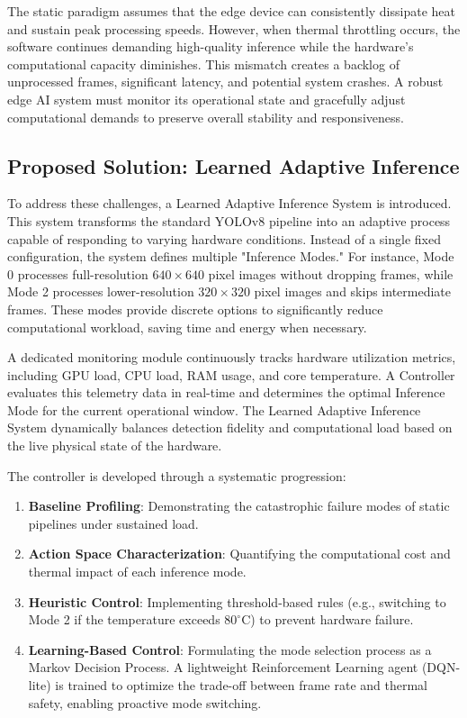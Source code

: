 \documentclass{ieeeaccess}
\begin{document}
The static paradigm assumes that the edge device can consistently dissipate heat and sustain peak processing speeds. However, when thermal throttling occurs, the software continues demanding high-quality inference while the hardware's computational capacity diminishes. This mismatch creates a backlog of unprocessed frames, significant latency, and potential system crashes. A robust edge AI system must monitor its operational state and gracefully adjust computational demands to preserve overall stability and responsiveness.

\subsection{Proposed Solution: Learned Adaptive Inference}
To address these challenges, a Learned Adaptive Inference System is introduced. This system transforms the standard YOLOv8 pipeline into an adaptive process capable of responding to varying hardware conditions. Instead of a single fixed configuration, the system defines multiple "Inference Modes." For instance, Mode 0 processes full-resolution $640 \times 640$ pixel images without dropping frames, while Mode 2 processes lower-resolution $320 \times 320$ pixel images and skips intermediate frames. These modes provide discrete options to significantly reduce computational workload, saving time and energy when necessary.

A dedicated monitoring module continuously tracks hardware utilization metrics, including GPU load, CPU load, RAM usage, and core temperature. A Controller evaluates this telemetry data in real-time and determines the optimal Inference Mode for the current operational window. The Learned Adaptive Inference System dynamically balances detection fidelity and computational load based on the live physical state of the hardware.

The controller is developed through a systematic progression:
\begin{enumerate}
    \item \textbf{Baseline Profiling}: Demonstrating the catastrophic failure modes of static pipelines under sustained load.
    \item \textbf{Action Space Characterization}: Quantifying the computational cost and thermal impact of each inference mode.
    \item \textbf{Heuristic Control}: Implementing threshold-based rules (e.g., switching to Mode 2 if the temperature exceeds $80^\circ$C) to prevent hardware failure.
    \item \textbf{Learning-Based Control}: Formulating the mode selection process as a Markov Decision Process. A lightweight Reinforcement Learning agent (DQN-lite) is trained to optimize the trade-off between frame rate and thermal safety, enabling proactive mode switching.
\end{enumerate}
\end{document}
